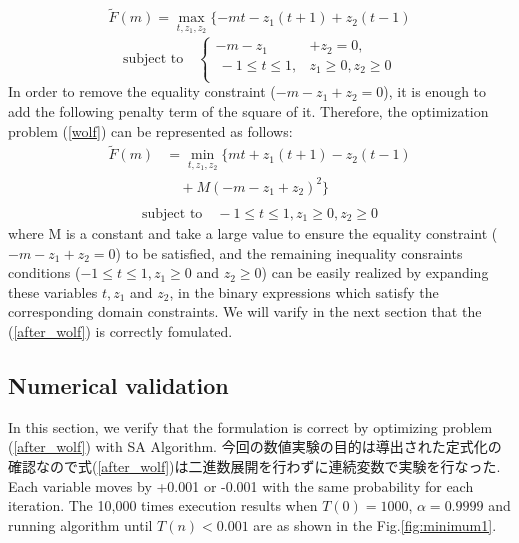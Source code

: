 \documentclass[fp,twocolumn]{jpsj3}
\begin{document}
\begin{eqnarray}
  \widetilde{F}(m)=\max_{t,z_{1},z_{2}}{\{-mt-z_{1}(t+1)+z_{2}(t-1)} \label{wolf}
\end{eqnarray}
\begin{equation}
  \text{subject to} \quad \left\{
  \begin{aligned}
   -m-z_{1}&+z_{2}=0, \nonumber \\
   \ -1\leq t\leq 1,& z_{1}\geq 0, z_{2}\geq 0 \nonumber \\
  \end{aligned}
  \right.
\end{equation}
In order to remove the equality constraint ($-m-z_{1}+z_{2}=0$), it is enough to add the following penalty term of the square of it. Therefore, the optimization problem (\ref{wolf}) can be represented as follows:
\begin{equation}
  \begin{aligned}
    \widetilde{F}(m)&=\min_{t,z_{1},z_{2}}{\{mt+z_{1}(t+1)-z_{2}(t-1)} \\
    &\quad+M(-m-z_{1}+z_{2})^{2}\} \label{after_wolf} \\
  \end{aligned}
\end{equation}
\begin{eqnarray}
  \text{subject to} \quad -1\leq t\leq 1, z_{1}\geq 0, z_{2}\geq 0 \nonumber
\end{eqnarray}
where M is a constant and take a large value to ensure the equality constraint ($-m-z_{1}+z_{2}=0$) to be satisfied, and the remaining inequality consraints conditions ($-1\leq t\leq 1, z_{1}\geq 0$ and $z_{2}\geq 0$) can be easily realized by expanding these variables $t,z_{1}$ and $z_{2}$, in the binary expressions which satisfy the corresponding domain constraints. We will varify in the next section that the (\ref{after_wolf}) is correctly fomulated. 

\subsection{Numerical validation}
In this section, we verify that the formulation is correct by optimizing problem (\ref{after_wolf}) with SA Algorithm. 今回の数値実験の目的は導出された定式化の確認なので式(\ref{after_wolf})は二進数展開を行わずに連続変数で実験を行なった. Each variable moves by +0.001 or -0.001 with the same probability for each iteration. The 10,000 times execution results when $T(0)=1000$, $\alpha=0.9999$ and running algorithm until $T(n)<0.001$ are as shown in the Fig.\ref{fig:minimum1}.
\end{document}
